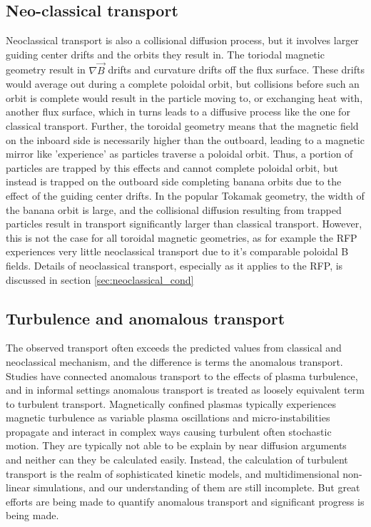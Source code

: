 \begin{refsection}
\subsection{Neo-classical transport}

Neoclassical transport is also a collisional diffusion process, but it involves larger guiding center drifts and the orbits they result in. The toriodal magnetic geometry result in $\nabla\vec{B}$ drifts and curvature drifts off the flux surface. These drifts would average out during a complete poloidal orbit, but collisions before such an orbit is complete would result in the particle moving to, or exchanging heat with, another flux surface, which in turns leads to a diffusive process like the one for classical transport. Further, the toroidal geometry means that the magnetic field on the inboard side is necessarily higher than the outboard, leading to a magnetic mirror like 'experience' as particles traverse a poloidal orbit. Thus, a portion of particles are trapped by this effects and cannot complete poloidal orbit, but instead is trapped on the outboard side completing banana orbits due to the effect of the guiding center drifts. In the popular Tokamak geometry, the width of the banana orbit is large, and the collisional diffusion resulting from trapped particles result in transport significantly larger than classical transport. However, this is not the case for all toroidal magnetic geometries, as for example the RFP experiences very little neoclassical transport due to it's comparable poloidal B fields. Details of neoclassical transport, especially as it applies to the RFP, is discussed in section \ref{sec:neoclassical_cond}

\subsection{Turbulence and anomalous transport}

The observed transport often exceeds the predicted values from classical and neoclassical mechanism, and the difference is terms the anomalous transport. Studies have connected anomalous transport to the effects of plasma turbulence, and in informal settings anomalous transport is treated as loosely equivalent term to turbulent transport. Magnetically confined plasmas typically experiences magnetic turbulence as variable plasma oscillations and micro-instabilities propagate and interact in complex ways causing turbulent often stochastic motion. They are typically not able to be explain by near diffusion arguments and neither can they be calculated easily. Instead, the calculation of turbulent transport is the realm of sophisticated kinetic models, and multidimensional non-linear simulations, and our understanding of them are still incomplete. But great efforts are being made to quantify anomalous transport and significant progress is being made.


\end{refsection}

